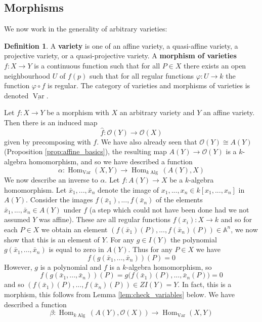 \documentclass[12pt]{article}
\theoremstyle{plain}
\theoremstyle{definition}
\newtheorem{defn}[thm]{Definition} %
\newcommand{\bb}[1]{\mathbb{#1}}
\newcommand{\call}[1]{\mathcal{#1}}
\newcommand{\lto}{\longrightarrow}
\begin{document}
\subsection{Morphisms}
We now work in the generality of arbitrary varieties:
\begin{defn}
A \textbf{variety} is one of an affine variety, a quasi-affine variety, a projective variety, or a quasi-projective variety. A \textbf{morphism of varieties} $f: X \lto Y$ is a continuous function such that for all $P \in X$ there exists an open neighbourhood $U$ of $f(p)$ such that for all regular functions $\varphi: U \lto k$ the function $\varphi \circ f$ is regular. The category of varieties and morphisms of varieties is denoted $\underline{\operatorname{Var}}$.
\end{defn}
Let $f: X \lto Y$ be a morphism with $X$ an arbitrary variety and $Y$ an affine variety. Then there is an induced map
\[\hat{f}: \call{O}(Y) \lto \call{O}(X)\]
given by precomposing with $f$. We have also already seen that $\call{O}(Y) \cong A(Y)$ (Proposition \ref{prop:affine_basics}), the resulting map $A(Y) \lto \call{O}(Y)$ is a $k$-algebra homomorphism, and so we have described a function
\begin{equation}
    \alpha: \operatorname{Hom}_{\operatorname{Var}}(X,Y) \lto \operatorname{Hom}_{k\operatorname{Alg}}(A(Y),X)
\end{equation}
We now describe an inverse to $\alpha$. Let $f: A(Y) \lto X$ be a $k$-algebra homomorphism. Let $\bar{x}_1,...,\bar{x}_n$ denote the image of $x_1,...,x_n \in k[x_1,...,x_n]$ in $A(Y)$. Consider the images $f(\bar{x}_1),...,f(\bar{x}_n)$ of the elements $\bar{x}_1,...,\bar{x}_n \in A(Y)$ under $f$ (a step which could not have been done had we not assumed $Y$ was affine). These are all regular functions $f(x_i): X \lto k$ and so for each $P \in X$ we obtain an element $(f(\bar{x}_1)(P),...,f(\bar{x}_n)(P)) \in \bb{A}^n$, we now show that this is an element of $Y$. For any $g \in I(Y)$ the polynomial $g(\bar{x}_1,...,\bar{x}_n)$ is equal to zero in $A(Y)$. Thus for any $P \in X$ we have
\[f(g(\bar{x}_1,...,\bar{x}_n))(P) = 0\]
However, $g$ is a polynomial and $f$ is a $k$-algebra homomorphism, so
\[f(g(\bar{x}_1,...,\bar{x}_n))(P) = g\big(f(\bar{x}_1)(P),...,\bar{x}_n(P)\big) = 0\]
and so $(f(\bar{x}_1)(P),...,f(\bar{x}_n)(P)) \in ZI(Y) = Y$.  In fact, this is a morphism, this follows from Lemma \ref{lem:check_variables} below. We have described a function
\begin{equation}
    \beta: \operatorname{Hom}_{k\operatorname{Alg}}(A(Y),\call{O}(X)) \lto \operatorname{Hom}_{\operatorname{Var}}(X,Y)
\end{equation}
\end{document}
